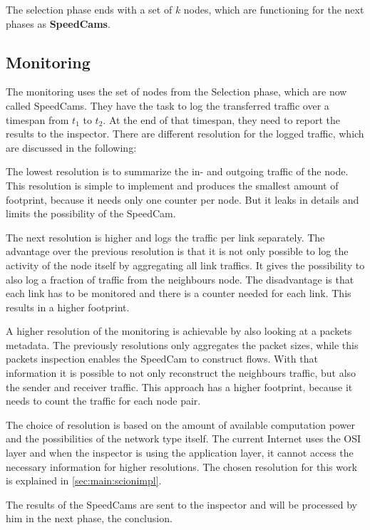 \documentclass[thesis.tex]{subfiles}
\begin{document}
The selection phase ends with a set of $k$ nodes, which are functioning for the next phases as \textbf{SpeedCams}.

\subsection{Monitoring} \label{sec:main:monitoringphase}
The monitoring uses the set of nodes from the Selection phase, which are now called SpeedCams. They have the task to log the transferred traffic over a timespan from $t_1$ to $t_2$. At the end of that timespan, they need to report the results to the inspector. There are different resolution for the logged traffic, which are discussed in the following:

The lowest resolution is to summarize the in- and outgoing traffic of the node. This resolution is simple to implement and produces the smallest amount of footprint, because it needs only one counter per node. But it leaks in details and limits the possibility of the SpeedCam.

The next resolution is higher and logs the traffic per link separately. The advantage over the previous resolution is that it is not only possible to log the activity of the node itself by aggregating all link traffics. It gives the possibility to also log a fraction of traffic from the neighbours node. The disadvantage is that each link has to be monitored and there is a counter needed for each link. This results in a higher footprint.

A higher resolution of the monitoring is achievable by also looking at a packets metadata. The previously resolutions only aggregates the packet sizes, while this packets inspection enables the SpeedCam to construct flows. With that information it is possible to not only reconstruct the neighbours traffic, but also the sender and receiver traffic. This approach has a higher footprint, because it needs to count the traffic for each node pair.

The choice of resolution is based on the amount of available computation power and the possibilities of the network type itself. The current Internet uses the OSI layer  and when the inspector is using the application layer, it cannot access the necessary information for higher resolutions. The chosen resolution for this work is explained in \autoref{sec:main:scionimpl}.

The results of the SpeedCams are sent to the inspector and will be processed by him in the next phase, the conclusion.
\end{document}
